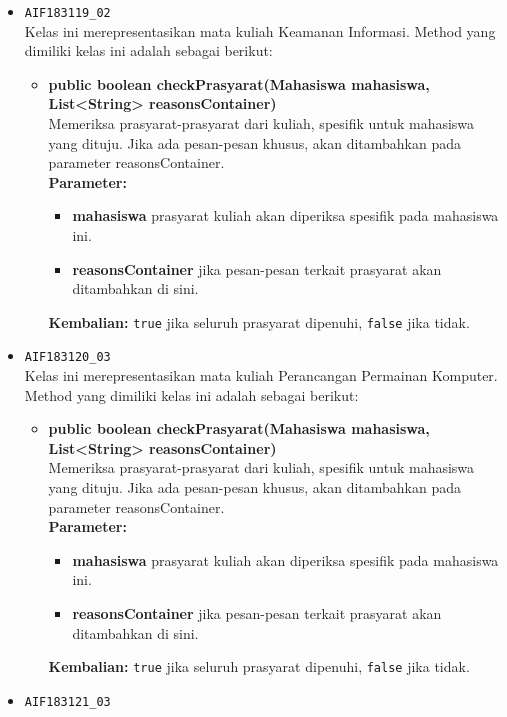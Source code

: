 \begin{enumerate}
\begin{itemize}
\begin{itemize}
		\end{itemize}
		\item \texttt{AIF183119\_02} \\
		Kelas ini merepresentasikan mata kuliah Keamanan Informasi. Method yang dimiliki kelas ini adalah sebagai berikut: 
		\begin{itemize}
			\item \textbf{public boolean checkPrasyarat(Mahasiswa mahasiswa, List<String> reasonsContainer)}\\
			Memeriksa prasyarat-prasyarat dari kuliah, spesifik untuk mahasiswa yang dituju. Jika ada pesan-pesan khusus, akan ditambahkan pada parameter reasonsContainer.\\
			\textbf{Parameter:}
			\begin{itemize}
				\item \textbf{mahasiswa} prasyarat kuliah akan diperiksa spesifik pada mahasiswa ini.
				\item \textbf{reasonsContainer} jika pesan-pesan terkait prasyarat akan ditambahkan di sini.
			\end{itemize}
			\textbf{Kembalian:} \texttt{true} jika seluruh prasyarat dipenuhi, \texttt{false} jika tidak.
		\end{itemize}
		\item \texttt{AIF183120\_03} \\
		Kelas ini merepresentasikan mata kuliah Perancangan Permainan Komputer. Method yang dimiliki kelas ini adalah sebagai berikut: 
		\begin{itemize}
			\item \textbf{public boolean checkPrasyarat(Mahasiswa mahasiswa, List<String> reasonsContainer)}\\
			Memeriksa prasyarat-prasyarat dari kuliah, spesifik untuk mahasiswa yang dituju. Jika ada pesan-pesan khusus, akan ditambahkan pada parameter reasonsContainer.\\
			\textbf{Parameter:}
			\begin{itemize}
				\item \textbf{mahasiswa} prasyarat kuliah akan diperiksa spesifik pada mahasiswa ini.
				\item \textbf{reasonsContainer} jika pesan-pesan terkait prasyarat akan ditambahkan di sini.
			\end{itemize}
			\textbf{Kembalian:} \texttt{true} jika seluruh prasyarat dipenuhi, \texttt{false} jika tidak.
		\end{itemize}
		\item \texttt{AIF183121\_03} \\

\end{itemize}
\end{enumerate}
